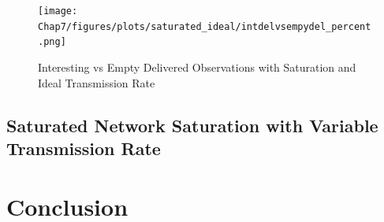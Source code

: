 	\begin{figure}[h]
	\centering
	\texttt{[image: Chap7/figures/plots/saturated\_ideal/intdelvsempydel\_percent.png]}
	\caption{Interesting vs Empty Delivered Observations with Saturation and Ideal Transmission Rate}
	\label{fig:sim:res:saturated:ideal:intempt}
	\end{figure}

\subsection{Saturated Network Saturation with Variable Transmission Rate}


\section{Conclusion} \label{sim:conc}
	







































